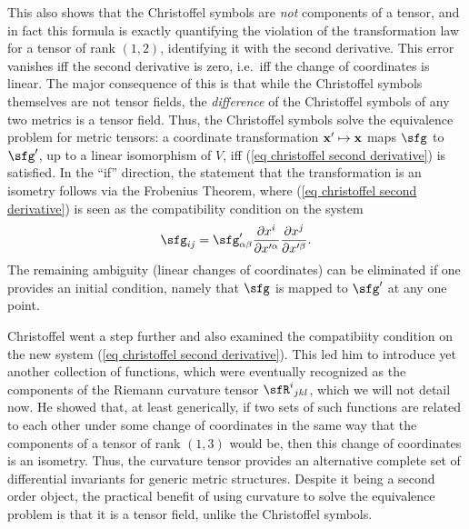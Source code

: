 \begin{rem}
    This also shows that the Christoffel symbols are \emph{not} components of a tensor, and in fact this formula is exactly quantifying the violation of the transformation law for a tensor of rank $(1,2)$, identifying it with the second derivative. This error vanishes iff the second derivative is zero, i.e.\ iff the change of coordinates is linear. The major consequence of this is that while the Christoffel symbols themselves are not tensor fields, the \emph{difference} of the Christoffel symbols of any two metrics is a tensor field. Thus, the Christoffel symbols solve the equivalence problem for metric tensors: a coordinate transformation $\bf{x}'\mapsto \bf{x}$ maps $\sfg$ to $\sfg'$, up to a linear isomorphism of $V$, iff (\ref{eq christoffel second derivative}) is satisfied. In the ``if'' direction, the statement that the transformation is an isometry follows via the Frobenius Theorem, where (\ref{eq christoffel second derivative}) is seen as the compatibility condition on the system 
    \[\sfg_{ij}=\sfg'_{\alpha\beta}\frac{\partial x^i}{\partial x^{\prime\alpha}}\frac{\partial x^j}{\partial x^{\prime\beta}}.\]
    The remaining ambiguity (linear changes of coordinates) can be eliminated if one provides an initial condition, namely that $\sfg$ is mapped to $\sfg'$ at any one point. 
    
    Christoffel went a step further and also examined the compatibiity condition on the new system (\ref{eq christoffel second derivative}). This led him to introduce yet another collection of functions, which were eventually recognized as the components of the Riemann curvature tensor $\sfR^{i}{}_{jkl}$, which we will not detail now. He showed that, at least generically, if two sets of such functions are related to each other under some change of coordinates in the same way that the components of a tensor of rank $(1,3)$ would be, then this change of coordinates is an isometry. Thus, the curvature tensor provides an alternative complete set of differential invariants for generic metric structures. Despite it being a second order object, the practical benefit of using curvature to solve the equivalence problem is that it is a tensor field, unlike the Christoffel symbols.
\end{rem}

